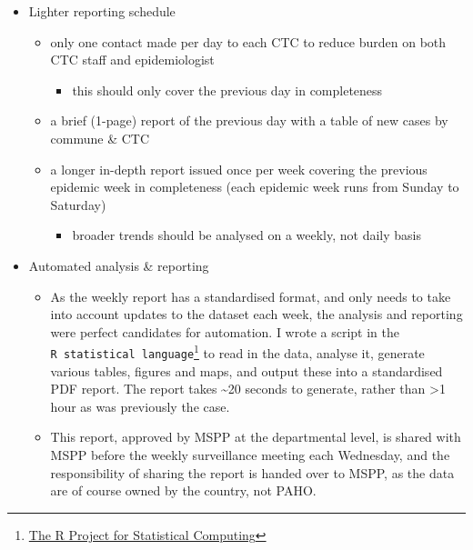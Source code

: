 \documentclass[]{tufte-handout}
\providecommand{\tightlist}{%
  \setlength{\itemsep}{0pt}\setlength{\parskip}{0pt}}
\begin{document}
\begin{itemize}
\tightlist
\item
  Lighter reporting schedule

  \begin{itemize}
  \tightlist
  \item
    only one contact made per day to each CTC to reduce burden on both
    CTC staff and epidemiologist

    \begin{itemize}
    \tightlist
    \item
      this should only cover the previous day in completeness
    \end{itemize}
  \item
    a brief (1-page) report of the previous day with a table of new
    cases by commune \& CTC
  \item
    a longer in-depth report issued once per week covering the previous
    epidemic week in completeness (each epidemic week runs from Sunday
    to Saturday)

    \begin{itemize}
    \tightlist
    \item
      broader trends should be analysed on a weekly, not daily basis
    \end{itemize}
  \end{itemize}
\item
  Automated analysis \& reporting

  \begin{itemize}
  \tightlist
  \item
    As the weekly report has a standardised format, and only needs to
    take into account updates to the dataset each week, the analysis and
    reporting were perfect candidates for automation. I wrote a script
    in the \texttt{R\ statistical\ language}\footnote{\href{https://www.r-project.org/}{The
      R Project for Statistical Computing}} to read in the data, analyse
    it, generate various tables, figures and maps, and output these into
    a standardised PDF report. The report takes \textasciitilde{}20
    seconds to generate, rather than \textgreater{}1 hour as was
    previously the case.
  \item
    This report, approved by MSPP at the departmental level, is shared
    with MSPP before the weekly surveillance meeting each Wednesday, and
    the responsibility of sharing the report is handed over to MSPP, as
    the data are of course owned by the country, not PAHO.
  \end{itemize}
\end{itemize}
\end{document}
